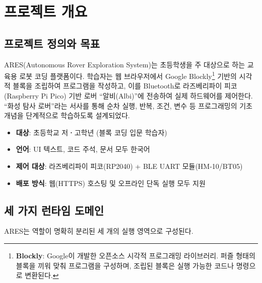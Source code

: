 \section{프로젝트 개요}

\subsection{프로젝트 정의와 목표}

ARES(Autonomous Rover Exploration System)는 초등학생을 주 대상으로 하는
교육용 로봇 코딩 플랫폼이다. 학습자는 웹 브라우저에서 Google Blockly\footnote{\textbf{Blockly}:
Google이 개발한 오픈소스 시각적 프로그래밍 라이브러리. 퍼즐 형태의 블록을 끼워 맞춰
프로그램을 구성하며, 조립된 블록은 실행 가능한 코드나 명령으로 변환된다.} 기반의
시각적 블록을 조립하여 프로그램을 작성하고, 이를 Bluetooth로 라즈베리파이
피코(Raspberry Pi Pico) 기반 로버 ``알비(Albi)''에 전송하여 실제 하드웨어를
제어한다. ``화성 탐사 로버''라는 서사를 통해 순차 실행, 반복, 조건, 변수 등
프로그래밍의 기초 개념을 단계적으로 학습하도록 설계되었다.

\begin{infobox}[title=프로젝트 핵심 특징]
\begin{itemize}
  \item \textbf{대상}: 초등학교 저\textbf{·}고학년 (블록 코딩 입문 학습자)
  \item \textbf{언어}: UI 텍스트, 코드 주석, 문서 모두 한국어
  \item \textbf{제어 대상}: 라즈베리파이 피코(RP2040) + BLE UART 모듈(HM-10/BT05)
  \item \textbf{배포 방식}: 웹(HTTPS) 호스팅 및 오프라인  단독 실행 모두 지원
\end{itemize}
\end{infobox}

\subsection{세 가지 런타임 도메인}

ARES는 역할이 명확히 분리된 세 개의 실행 영역으로 구성된다.

